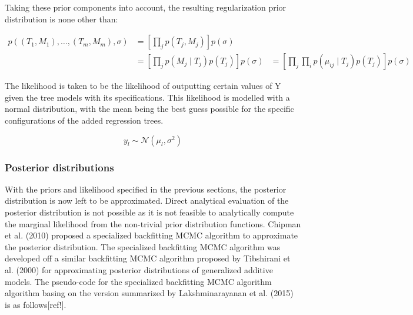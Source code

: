 \documentclass{usiinftr}
\begin{document}
Taking these prior components into account, the resulting regularization prior distribution is none other 
than:

\begin{equation}
\begin{aligned}
p\left(\left(T_{1}, M_{1}\right), \ldots,\left(T_{m}, M_{m}\right), \sigma\right) &=\left[\prod_{j} p\left(T_{j}, M_{j}\right)\right] p(\sigma) \\
&=\left[\prod_{j} p\left(M_{j} \mid T_{j}\right) p\left(T_{j}\right)\right] p(\sigma)
&= \left[\prod_{j}  \prod_{i} p\left(\mu_{i j} \mid T_{j}\right) p\left(T_{j}\right)\right] p(\sigma)
\end{aligned}
\end{equation}

The likelihood is taken to be the likelihood of outputting certain values of Y given the tree models with its specifications. This likelihood is modelled with a normal distribution, with the mean being the best guess possible for the specific configurations of the added regression trees.

\begin{equation}
y_l \sim \mathcal{N}(\mu_l, \sigma^2)
\end{equation}

\subsubsection{Posterior distributions}
With the priors and likelihood specified in the previous sections, the posterior distribution is now left to be approximated. Direct analytical evaluation of the posterior distribution is not possible as it is not feasible to analytically compute the marginal likelihood from the non-trivial prior distribution functions. Chipman et al. (2010) proposed a specialized backfitting MCMC algorithm to approximate the posterior distribution. The specialized backfitting MCMC algorithm was developed off a similar backfitting MCMC algorithm proposed by Tibshirani et al. (2000) for approximating posterior distributions of generalized additive models. The pseudo-code for the specialized backfitting MCMC algorithm algorithm basing on the version summarized by Lakshminarayanan et al. (2015) is as follows[ref!].
\end{document}
